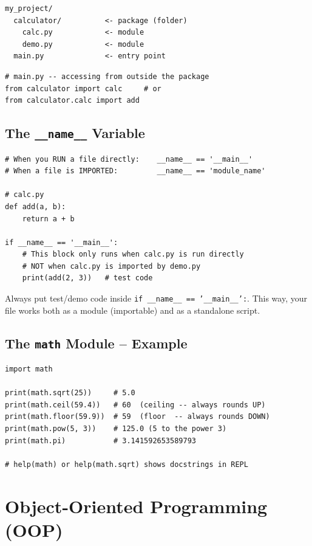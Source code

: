 \documentclass[12pt,a4paper]{article}
\newcommand{\code}[1]{\texttt{\small\color{pyblue}#1}}
\begin{document}
\begin{verbatim}
my_project/
  calculator/          <- package (folder)
    calc.py            <- module
    demo.py            <- module
  main.py              <- entry point
\end{verbatim}

\begin{lstlisting}
# main.py -- accessing from outside the package
from calculator import calc     # or
from calculator.calc import add
\end{lstlisting}

\subsection{The \texttt{\_\_name\_\_} Variable}

\begin{lstlisting}
# When you RUN a file directly:    __name__ == '__main__'
# When a file is IMPORTED:         __name__ == 'module_name'

# calc.py
def add(a, b):
    return a + b

if __name__ == '__main__':
    # This block only runs when calc.py is run directly
    # NOT when calc.py is imported by demo.py
    print(add(2, 3))   # test code
\end{lstlisting}

\begin{tipbox}
Always put test/demo code inside \code{if \_\_name\_\_ == '\_\_main\_\_':}. This way, your file works both as a module (importable) and as a standalone script.
\end{tipbox}

\subsection{The \texttt{math} Module -- Example}

\begin{lstlisting}
import math

print(math.sqrt(25))     # 5.0
print(math.ceil(59.4))   # 60  (ceiling -- always rounds UP)
print(math.floor(59.9))  # 59  (floor  -- always rounds DOWN)
print(math.pow(5, 3))    # 125.0 (5 to the power 3)
print(math.pi)           # 3.141592653589793

# help(math) or help(math.sqrt) shows docstrings in REPL
\end{lstlisting}

\section{Object-Oriented Programming (OOP)}
\end{document}
